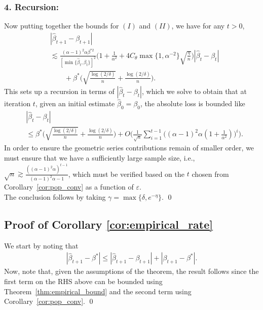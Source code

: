 \documentclass[runningheads]{llncs}
\begin{document}
\begin{subappendices}
\subsubsection{4. Recursion:}
Now putting together the bounds for $(I)$ and $(II)$, we have
for any $t>0$,
\begin{align*}
  &
    |\hat{\beta}_{t+1} - \beta_{t+1}|
  \\
  &
    \lesssim
    \frac{(\alpha - 1)^2\alpha \beta^{*2}}
    {[\min\{\hat{\beta}_t, \beta_t\}]^2}
    \Big(
    1 + \frac{1}{\alpha^2}
    +
    4C_{\theta}\max\{1, \alpha^{-2}\} \sqrt{\frac{\eta}{n}}
    \Big)|\hat{\beta}_t - \beta_t|
  \\
  & \qquad
    +
    \beta^* \Big(\sqrt{\frac{\log(2/ \delta)}{n}} + \frac{\log(2/ \delta)}{n}\Big).
\end{align*}
This sets up a recursion in terms of $|\hat{\beta}_{t} - \beta_{t}|$, which we
solve to obtain that at iteration $t$, given an initial estimate $\hat{\beta}_0
= \beta_0$, the absolute loss is bounded like
\begin{align*}
  &
    |\hat{\beta}_{t} - \beta_{t}|
  \\
  &\leq
    \beta^*
    \Big(\sqrt{\frac{\log(2/ \delta)}{n}}
    + \frac{\log(2/ \delta)}{n}\Big)
    +
    O\Big(\frac{1}{\sqrt{n}}
    \sum_{i=1}^{t-1}
    \Big(
    (\alpha - 1)^2\alpha
    ( 1 + \frac{1}{\alpha^2} )
    \Big)^i
    \Big).
\end{align*}
In order to ensure the geometric series contributions remain of smaller order,
we must ensure that we have a sufficiently large sample size, i.e.,
$\sqrt{n} \gtrsim \frac{((\alpha - 1)^2\alpha)^{t-1}}{(\alpha - 1)^2\alpha -1}$,
which must be verified based on the $t$ chosen from Corollary~\ref{cor:pop_conv}
as a function of $\varepsilon$.
\\
\noindent
The conclusion follows by taking $\gamma = \max\{\delta, e^{-\eta}\}$.
\qed

\subsection*{Proof of Corollary \ref{cor:empirical_rate}}
We start by noting that
\begin{align*}
|\hat{\beta}_{t+1}-\beta^*| \leq |\hat{\beta}_{t+1}-\beta_{t+1}| + |\beta_{t+1}-\beta^*|.
\end{align*}
Now, note that, given the assumptions of the theorem, the result follows since
the first term on the RHS above can be bounded using
Theorem~\ref{thm:empirical_bound} and the second term using Corollary~\ref{cor:pop_conv}.
\qed


\end{subappendices}
\end{document}
